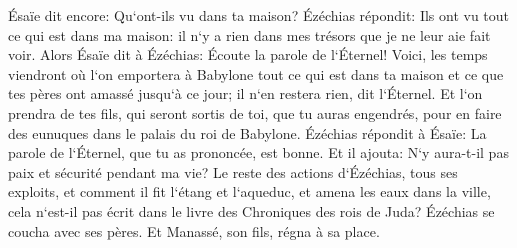 \verse Ésaïe dit encore: Qu`ont-ils vu dans ta maison? Ézéchias répondit: Ils ont vu tout ce qui est dans ma maison: il n`y a rien dans mes trésors que je ne leur aie fait voir. 
\verse Alors Ésaïe dit à Ézéchias: Écoute la parole de l`Éternel! 
\verse Voici, les temps viendront où l`on emportera à Babylone tout ce qui est dans ta maison et ce que tes pères ont amassé jusqu`à ce jour; il n`en restera rien, dit l`Éternel. 
\verse Et l`on prendra de tes fils, qui seront sortis de toi, que tu auras engendrés, pour en faire des eunuques dans le palais du roi de Babylone. 
\verse Ézéchias répondit à Ésaïe: La parole de l`Éternel, que tu as prononcée, est bonne. Et il ajouta: N`y aura-t-il pas paix et sécurité pendant ma vie? 
\verse Le reste des actions d`Ézéchias, tous ses exploits, et comment il fit l`étang et l`aqueduc, et amena les eaux dans la ville, cela n`est-il pas écrit dans le livre des Chroniques des rois de Juda? 
\verse Ézéchias se coucha avec ses pères. Et Manassé, son fils, régna à sa place. 

